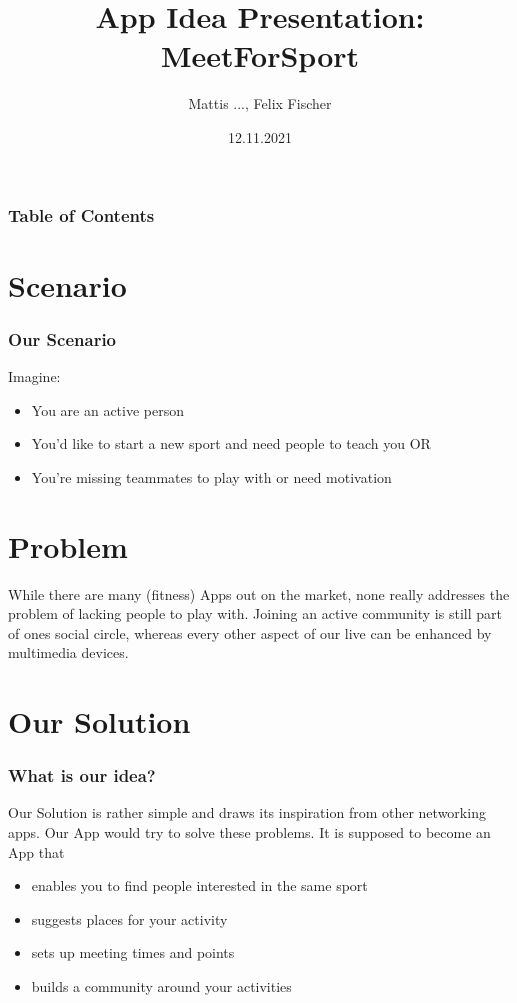 \documentclass[aspectratio=169]{beamer}
\title{App Idea Presentation: MeetForSport}
\author{Mattis ..., Felix Fischer}
\date{12.11.2021}
\begin{document}
\maketitle



\begin{frame}
    \frametitle{Table of Contents}
    \tableofcontents
\end{frame}





\section{Scenario}
\begin{frame}   
\frametitle{Our Scenario}
Imagine:
         \begin{itemize}	
	 \item You are an active person
	 \item You'd like to start a new sport and need people to teach you OR
	 \item You're missing teammates to play with or need motivation
    \end{itemize}
\end{frame}


\section{Problem}
\begin{frame}   
While there are many (fitness) Apps out on the market, none really addresses the problem of lacking people to play with.
Joining an active community is still part of ones social circle, whereas every other aspect of our live can be enhanced by multimedia devices.
\end{frame}


\section{Our Solution}
\begin{frame}   
\frametitle{What is our idea?}
Our Solution is rather simple and draws its inspiration from other networking apps.
Our App would try to solve these problems. It is supposed to become an App that
         \begin{itemize}	
	 \item enables you to find people interested in the same sport
	 \item suggests places for your activity 
	 \item sets up meeting times and points
	 \item builds a community around your activities 
    \end{itemize}
\end{frame}
\end{document}

